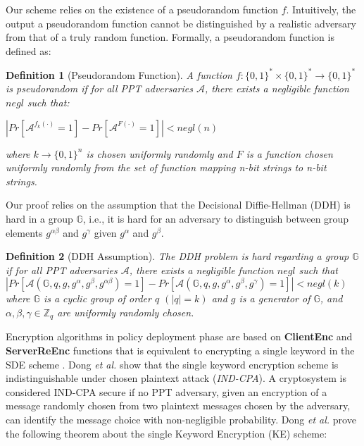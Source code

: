 \documentclass[final,5p,times,twocolumn]{elsarticle}
\newtheorem{definition}{Definition}
\begin{document}
Our scheme relies on the existence of a pseudorandom function $f$. Intuitively, the output a pseudorandom function cannot be distinguished by a realistic adversary from that of a truly random function. Formally, a pseudorandom function is defined as:

\begin{definition}[Pseudorandom Function]
A function $f:\{0,1\}^* \times \{0,1\}^* \rightarrow \{0,1\}^*$ is pseudorandom if for all PPT adversaries $\mathcal{A}$, there exists a negligible function $negl$ such that:
\begin{center}
$|Pr[\mathcal{A}^{f_k(\cdot)}=1]-Pr[\mathcal{A}^{F(\cdot)}=1]|<negl(n)$
\end{center}
where $k \rightarrow \{0,1\}^n$ is chosen uniformly randomly and $F$ is a function chosen uniformly randomly from the set of function mapping n-bit strings to n-bit strings.
\end{definition}

Our proof relies on the assumption that the Decisional Diffie-Hellman (DDH) is hard in a group $\mathbb{G}$, i.e., it is hard for an adversary to distinguish between group elements $g^{\alpha \beta}$ and  $g^{\gamma}$ given  $g^{\alpha}$ and  $g^{\beta}$.

\begin{definition}[DDH Assumption]
The DDH problem is hard regarding a group $\mathbb{G}$ if for all PPT adversaries $\mathcal{A}$, there
exists a negligible function $negl$ such that
$|Pr[\mathcal{A}(\mathbb{G},q,g,g^\alpha,g^\beta,g^{\alpha \beta } )=1]-Pr[\mathcal{A}(\mathbb{G},q,g,g^\alpha,g^\beta,g^\gamma)=1]|<negl(k)$
where $\mathbb{G}$ is a cyclic group of order $q$ $(|q| = k)$ and $g$ is a generator of $\mathbb{G}$, and $\alpha, \beta, \gamma \in \mathbb{Z}_q$ are uniformly randomly chosen.
\end{definition}

Encryption algorithms in policy deployment phase are based on \textbf{ClientEnc} and \textbf{ServerReEnc} functions that is equivalent to encrypting a single keyword in the SDE scheme \cite{Dong2011}. Dong \emph{et al.} \cite{Dong2011} show that the single keyword encryption scheme is indistinguishable under chosen plaintext attack (\textit{IND-CPA}). A cryptosystem is considered IND-CPA secure if no PPT adversary, given an encryption of a message randomly chosen from two plaintext messages chosen by the adversary, can identify the message choice with non-negligible probability. Dong \emph{et al.} \cite{Dong2011} prove the following theorem about the single Keyword Encryption (KE) scheme:
\end{document}
